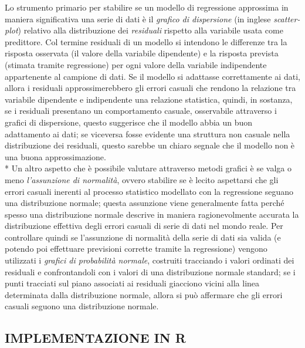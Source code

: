 \documentclass[12pt,a4paper,openright,twoside]{report}
\begin{document}
Lo strumento primario per stabilire se un modello di regressione approssima in maniera significativa una serie di dati è il \emph{grafico di dispersione} (in inglese \emph{scatter-plot}) relativo alla distribuzione dei \emph{residuali} rispetto alla variabile usata come predittore. Col termine residuali di un modello si intendono le differenze
tra la risposta osservata (il valore della variabile dipendente) e la risposta prevista (stimata tramite regressione) per ogni valore della variabile indipendente appartenente al campione di dati. Se il modello si adattasse correttamente ai dati, allora i residuali approssimerebbero gli errori casuali che rendono la relazione tra variabile dipendente e indipendente una relazione statistica, quindi, in sostanza, se i residuali presentano un comportamento casuale, osservabile attraverso i grafici di dispersione, questo suggerisce che il modello abbia un buon adattamento ai dati; se viceversa fosse evidente una struttura non casuale nella distribuzione dei residuali, questo sarebbe un chiaro segnale che il modello non è una buona approssimazione.\\*
Un altro aspetto che è possibile valutare attraverso metodi grafici è se valga o meno \emph{l'assunzione di normalità}, ovvero stabilire se è lecito aspettarsi che gli errori casuali inerenti al processo statistico modellato con la regressione seguano una distribuzione normale; questa assunzione viene generalmente fatta perché spesso una distribuzione normale descrive in maniera ragionevolmente accurata la distribuzione effettiva degli errori casuali di serie di dati nel mondo reale. Per controllare quindi se l'assunzione di normalità della serie di dati sia valida (e potendo poi effettuare previsioni corrette tramite la regressione) vengono utilizzati i \emph{grafici di probabilità normale}, costruiti tracciando i valori ordinati dei residuali e confrontandoli con i valori di una distribuzione  normale standard; se i punti tracciati sul piano associati ai residuali giacciono vicini alla linea determinata dalla distribuzione normale, allora si può affermare che gli errori casuali seguono una distribuzione normale.


\subsection{IMPLEMENTAZIONE IN R}
\end{document}

